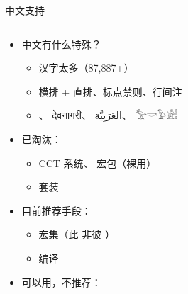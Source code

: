 \begin{frame}{中文支持}
\begin{columns}
\begin{column}{0.65\textwidth}
  \begin{itemize}
    \item 中文有什么特殊？\pause

      \begin{itemize}
        \item 汉字太多（87,887+）\pause
        \item 横排 + 直排、标点禁则、行间注  \pause
        \item {}、
              {\NotoDevanagari देवनागरी}、
              {\NotoArabic العَرَبِيَّة‎}、
              {\NotoEgyptian 𓅡𓎡𓅱𓀀𓏪}
      \end{itemize} \pause

    \item 已淘汰：

      \begin{itemize}
        \item CCT 系统、 宏包（裸用）
        \item \CTeX{} 套装
      \end{itemize} \pause

    \item 目前推荐手段：

      \begin{itemize}
        \item \alert{ 宏集}（此  非彼 \CTeX{}）
        \item \XeLaTeX{} 编译
      \end{itemize} \pause

    \item 可以用，不推荐：


\end{itemize}
\end{column}
\end{columns}
\end{frame}
